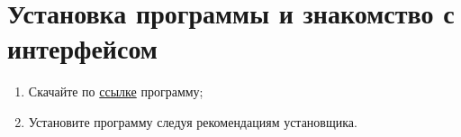 \documentclass[14pt,a4paper]{article}
\begin{document}
\section{Установка программы и знакомство с интерфейсом}
\begin{enumerate}
    \item Скачайте по \href{https://sourceforge.net/projects/scidavis/files/latest/download}{ссылке} программу;
    \item Установите программу следуя рекомендациям установщика.
\end{enumerate}
\end{document}
